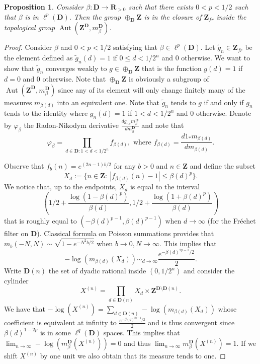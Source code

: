 \documentclass[a4paper,12pt]{amsart}
\numberwithin{equation}{section}
\newtheorem{prop}[theo]{Proposition}
\theoremstyle{definition}
\DeclareMathOperator{\Aut}{Aut}
\newcommand{\D}{\mathbf D}
\newcommand{\mbD}{m_\beta^\D}
\newcommand{\R}{\mathbf{R}}
\newcommand{\Z}{\mathbf{Z}}
\begin{document}
\begin{prop}\label{prop:closurZfr}
Consider $\beta:\D\to \R_{>0}$ such that there exists $0< p < 1/2$ such that $\beta$ is in $\ell^p(\D).$
Then the group $\oplus_\D\Z$ is in the closure of $\Z_{fr}$ inside the topological group $\Aut(\Z^\D, \mbD)$.
\end{prop}
\begin{proof}
Consider $\beta$ and $0<p<1/2$ satisfying that $\beta\in\ell^p(\D).$
Let $\tilde g_n\in\Z_{fr}$ be the element defined as $\tilde g_n(d) = 1$ if $0\leq d < 1/2^n$ and $0$ otherwise.
We want to show that $\tilde g_n$ converges weakly to $g\in\oplus_\D\Z$ that is the function $g(d) =1$ if $d=0$ and $0$ otherwise.
Note that $\oplus_\D \Z$ is obviously a subgroup of $\Aut(\Z^\D, \mbD)$ since any of its element will only change finitely many of the measures $m_{\beta(d)}$ into an equivalent one.
Note that $\tilde g_n$ tends to $g$ if and only if $g_n$ tends to the identity where $g_n(d)=1$ if $1<d<1/2^n$ and $0$ otherwise.
Denote by $\varphi_\beta$ the Radon-Nikodym derivative $\tfrac{d{g_n}_* \mbD}{ d \mbD}$ and note that 
$$\varphi_\beta=\prod_{d\in\D: 1<d< 1/2^n} f_{\beta(d)}, \text{ where } f_{\beta(d)} =  \dfrac{d1_* m_{\beta(d)}}{ d m_{\beta(d)}}.$$

Observe that $f_b(n) = e^{(2n-1)b/2}$ for any $b>0$ and $n\in\Z$ and define the subset
$$X_d:=\{ n\in\Z :\ | f_{\beta(d)}(n) -1 | \leq \beta(d)^p\}.$$
We notice that, up to the endpoints, $X_d$ is equal to the interval 
$$( 1/2 + \dfrac{\log(1 - \beta(d)^p)}{\beta(d)} , 1/2 + \dfrac{\log(1 +\beta(d)^p)}{\beta(d)} )$$ that is roughly equal to $(-\beta(d)^{p-1}, \beta(d)^{p-1})$ when $d\to\infty$ (for the Fr\'echet filter on $\D$).
Classical formula on Poisson summations provides that $m_b(-N,N)\sim \sqrt{1-e^{-N^2b/2}}$ when $b\to 0, N\to \infty.$
This implies that $$-\log( m_{\beta(d)} ( X_d ) ) \sim_{d\to \infty} \dfrac{ e^{-\beta(d)^{2p-1}/2 } }{2}.$$
Write $\D(n)$ the set of dyadic rational inside $(0,1/2^n)$ and consider the cylinder 
$$X^{(n)}=\prod_{ d\in\D(n)} X_d \times \Z^{\D\setminus \D(n)}.$$
We have that $-\log(X^{(n)}) = \sum_{d\in\D(n)} -\log( m_{\beta(d)} ( X_d ) ) $ whose coefficient is equivalent at infinity to $\tfrac{ e^{-\beta(d)^{2p-1}/2 } }{2}$ and is thus convergent since $\beta(d)^{1-2p}$ is in some $\ell^q(\D)$ spaces.
This implies that $\lim_{n\to\infty} -\log(\mbD(X^{(n)})) =0$ and thus $\lim_{n\to\infty} \mbD(X^{(n)})=1.$
If we shift $X^{(n)}$ by one unit we also obtain that its measure tends to one.


\end{proof}
\end{document}
